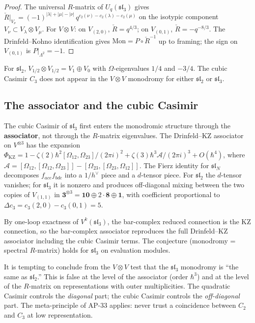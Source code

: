 \documentclass[11pt]{article}
\newcommand{\fsl}{\mathfrak{sl}}
\begin{document}
\begin{proof}
The universal $R$-matrix of $U_q(\fsl_3)$ gives
$\check{R}|_{V_\nu} = (-1)^{|\lambda|+|\mu|-|\nu|}\,
q^{c_2(\nu) - c_2(\lambda) - c_2(\mu)}$
on the isotypic component $V_\nu \subset V_\lambda \otimes V_\mu$.
For $V \otimes V$: on $V_{(2,0)}$, $\check{R} = q^{4/3}$;
on $V_{(0,1)}$, $\check{R} = -q^{-8/3}$.
The Drinfeld--Kohno identification gives
$\mathrm{Mon} = P \circ \check{R}^{-1}$ up to framing;
the sign on $V_{(0,1)}$ is $P|_{\Lambda^2} = -1$.
\end{proof}

\begin{remark}[Comparison with $\fsl_2$]
For $\fsl_2$, $V_{1/2} \otimes V_{1/2} = V_1 \oplus V_0$ with
$\Omega$-eigenvalues $1/4$ and $-3/4$.  The cubic Casimir $C_3$
does not appear in the $V \otimes V$ monodromy for either
$\fsl_2$ or $\fsl_3$.
\end{remark}


\subsection{The associator and the cubic Casimir}
\label{subsec:sl3-associator}

The cubic Casimir of $\fsl_3$ first enters the monodromic
structure through the \textbf{associator}, not through the
$R$-matrix eigenvalues.  The Drinfeld--KZ associator on
$V^{\otimes 3}$ has the expansion
$\Phi_{\mathrm{KZ}} = 1 - \zeta(2)\hbar^2 [\Omega_{12},\Omega_{23}]/(2\pi i)^2
+ \zeta(3)\hbar^3 \mathcal{A}/(2\pi i)^3 + O(\hbar^4)$,
where $\mathcal{A} = [\Omega_{12},[\Omega_{12},\Omega_{23}]]
- [\Omega_{23},[\Omega_{23},\Omega_{12}]]$.  The Fierz identity
for $\fsl_N$ decomposes $f_{ace}f_{bde}$ into a $1/h^\vee$ piece
and a $d$-tensor piece.  For $\fsl_2$ the $d$-tensor vanishes;
for $\fsl_3$ it is nonzero and produces off-diagonal mixing between
the two copies of $V_{(1,1)}$ in $\mathbf{3}^{\otimes 3}
= \mathbf{10} \oplus 2\cdot\mathbf{8} \oplus \mathbf{1}$,
with coefficient proportional to
$\Delta c_3 = c_3(2,0) - c_3(0,1) = 5$.

By one-loop exactness of $V^k(\fsl_3)$, the bar-complex
reduced connection is the KZ connection, so the bar-complex
associator reproduces the full Drinfeld--KZ associator including
the cubic Casimir terms.  The conjecture (monodromy = spectral
$R$-matrix) holds for $\fsl_3$ on evaluation modules.

\begin{warning}
It is tempting to conclude from the $V \otimes V$ test that the
$\fsl_3$ monodromy is ``the same as $\fsl_2$.''  This is false
at the level of the associator (order $\hbar^3$) and at the
level of the $R$-matrix on representations with outer
multiplicities.  The quadratic Casimir controls the \emph{diagonal}
part; the cubic Casimir controls the \emph{off-diagonal} part.
The meta-principle of AP-33 applies: never trust a coincidence
between $C_2$ and $C_3$ at low representation.
\end{warning}
\end{document}
